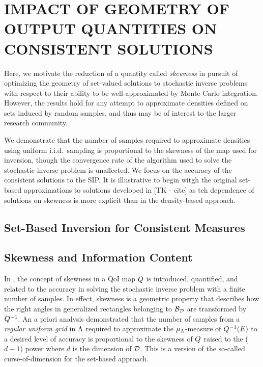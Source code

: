 \chapter{\uppercase{Impact of Geometry of Output Quantities on Consistent Solutions} \label{chapter:geometry}}

Here, we motivate the reduction of a quantity called \emph{skewness} in pursuit of optimizing the geometry of set-valued solutions to stochastic inverse problems with respect to their ability to be well-approximated by Monte-Carlo integration.
However, the results hold for any attempt to approximate densities defined on sets induced by random samples, and thus may be of interest to the larger research community.

We demonstrate that the number of samples required to approximate densities using uniform i.i.d.~sampling is proportional to the skewness of the map used for inversion, though the convergence rate of the algorithm used to solve the stochastic inverse problem is unaffected.
We focus on the accuracy of the consistent solutions to the SIP.
It is illustrative to begin witgh the original set-based approximations to solutions developed in \cite{} [TK - cite] as teh dependence of solutions on skewness is more explicit than in the density-based approach.


\section{Set-Based Inversion for Consistent Measures}\label{sec:set-based}






\section{Skewness and Information Content}\label{sec:skewness}
In \cite{BGE+15}, the concept of skewness in a QoI map $Q$ is introduced, quantified, and related to the accuracy in solving the stochastic inverse problem with a finite number of samples.
In effect, skewness is a geometric property that describes how the right angles in generalized rectangles belonging to $\mathcal{B}_{\mathcal{D}}$ are transformed by $Q^{-1}$.
An a priori analysis demonstrated that the number of samples from a {\em regular uniform grid} in ${\Lambda}$ required to approximate the $\mu_{{\Lambda}}$-measure of $Q^{-1}(E)$ to a desired level of accuracy is proportional to the skewness of $Q$ raised to the ($d-1$) power where $d$ is the dimension of $\mathcal{D}$.
This is a version of the so-called curse-of-dimension for the set-based approach.

